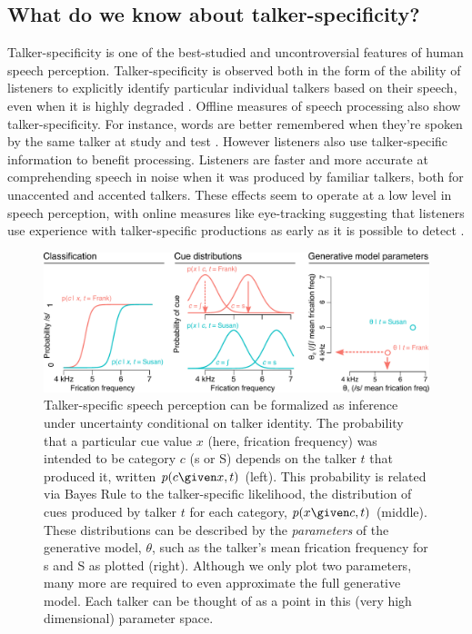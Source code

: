 \subsection{What do we know about talker-specificity?}
\label{sec:what-do-we-know-talker-spec}

Talker-specificity is one of the best-studied and uncontroversial features of human speech perception.  Talker-specificity is observed both in the form of the ability of listeners to explicitly identify particular individual talkers based on their speech, even when it is highly degraded \autocite{Bricker1966,Palmeri1993,Remez1997,Sheffert2002}.  Offline measures of speech processing also show talker-specificity.  For instance, words are better remembered when they're spoken by the same talker at study and test \autocite{Goldinger1996,Palmeri1993}.  However listeners also use talker-specific information to benefit processing.  Listeners are faster and more accurate at comprehending speech in noise when it was produced by familiar talkers, both for unaccented \autocite{Nygaard1998} and accented \autocite{Clarke2004} talkers.  These effects seem to operate at a low level in speech perception, with online measures like eye-tracking suggesting that listeners use experience with talker-specific productions as early as it is possible to detect \autocite{Creel2008,Mitterer2013}.

\begin{figure}[htb]
  \centering
  \includegraphics[width=\textwidth]{part2-schematics/part2-fig1-assembled.pdf}
  \caption{Talker-specific speech perception can be formalized as inference under uncertainty conditional on talker identity.  The probability that a particular cue value $x$ (here, frication frequency) was intended to be category $c$ (\ph s or \ph S) depends on the talker $t$ that produced it, written $p(c \given x, t)$ (left).  This probability is related via Bayes Rule to the talker-specific likelihood, the distribution of cues produced by talker $t$ for each category, $p(x \given c, t)$ (middle).  These distributions can be described by the \emph{parameters} of the generative model, $\theta$, such as the talker's mean frication frequency for \ph s and \ph S as plotted (right).  Although we only plot two parameters, many more are required to even approximate the full generative model.  Each talker can be thought of as a point in this (very high dimensional) parameter space.}
  \label{fig:gen-model-points}
\end{figure}

